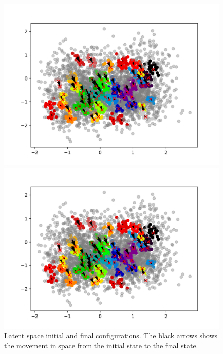 \documentclass[mscthesis]{usiinfthesis}
\begin{document}
\begin{figure}[ht] 
  \label{ fig7} 
  \begin{minipage}[b]{0.5\linewidth}
    \centering
    \includegraphics[width=\textwidth]{latentspace_cluster_region.png}
    \vspace{4ex}
  \end{minipage}%
  \begin{minipage}[b]{0.5\linewidth}
    \centering
    \includegraphics[width=\textwidth]{latentspace_cluster_region.png}
    \vspace{4ex}
  \end{minipage}  
\caption{Latent space initial and final configurations. The black arrows shows the movement in space from the initial state to the final state.}
\label{fig:latentspace_cluster}
\end{figure}
\end{document}
